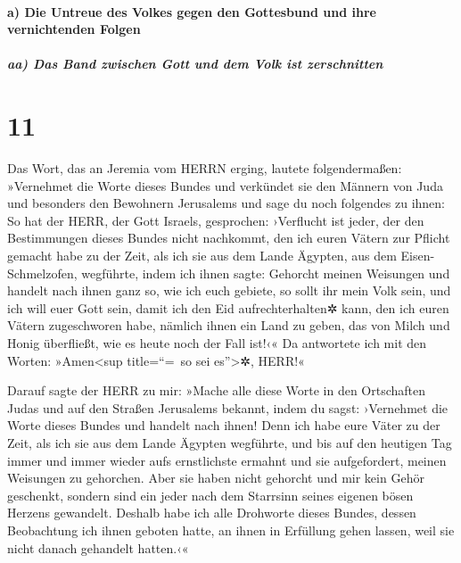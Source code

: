 \hypertarget{a-die-untreue-des-volkes-gegen-den-gottesbund-und-ihre-vernichtenden-folgen}{%
\paragraph{a) Die Untreue des Volkes gegen den Gottesbund und ihre
vernichtenden
Folgen}\label{a-die-untreue-des-volkes-gegen-den-gottesbund-und-ihre-vernichtenden-folgen}}

\hypertarget{aa-das-band-zwischen-gott-und-dem-volk-ist-zerschnitten}{%
\subparagraph{aa) Das Band zwischen Gott und dem Volk ist
zerschnitten}\label{aa-das-band-zwischen-gott-und-dem-volk-ist-zerschnitten}}

\hypertarget{section-10}{%
\section{11}\label{section-10}}

Das Wort, das an Jeremia vom HERRN erging, lautete
folgendermaßen: »Vernehmet die Worte dieses Bundes und
verkündet sie den Männern von Juda und besonders den Bewohnern
Jerusalems und sage du noch folgendes zu ihnen: So hat der
HERR, der Gott Israels, gesprochen: ›Verflucht ist jeder, der den
Bestimmungen dieses Bundes nicht nachkommt, den ich euren
Vätern zur Pflicht gemacht habe zu der Zeit, als ich sie aus dem Lande
Ägypten, aus dem Eisen-Schmelzofen, wegführte, indem ich ihnen sagte:
Gehorcht meinen Weisungen und handelt nach ihnen ganz so, wie ich euch
gebiete, so sollt ihr mein Volk sein, und ich will euer Gott sein,
damit ich den Eid aufrechterhalten✲ kann, den ich euren
Vätern zugeschworen habe, nämlich ihnen ein Land zu geben, das von Milch
und Honig überfließt, wie es heute noch der Fall ist!‹« Da antwortete
ich mit den Worten: »Amen\textless sup title=``=~so sei
es''\textgreater✲, HERR!«

Darauf sagte der HERR zu mir: »Mache alle diese Worte in
den Ortschaften Judas und auf den Straßen Jerusalems bekannt, indem du
sagst: ›Vernehmet die Worte dieses Bundes und handelt nach ihnen!
Denn ich habe eure Väter zu der Zeit, als ich sie aus dem
Lande Ägypten wegführte, und bis auf den heutigen Tag immer und immer
wieder aufs ernstlichste ermahnt und sie aufgefordert, meinen Weisungen
zu gehorchen. Aber sie haben nicht gehorcht und mir kein
Gehör geschenkt, sondern sind ein jeder nach dem Starrsinn seines
eigenen bösen Herzens gewandelt. Deshalb habe ich alle Drohworte dieses
Bundes, dessen Beobachtung ich ihnen geboten hatte, an ihnen in
Erfüllung gehen lassen, weil sie nicht danach gehandelt hatten.‹«

